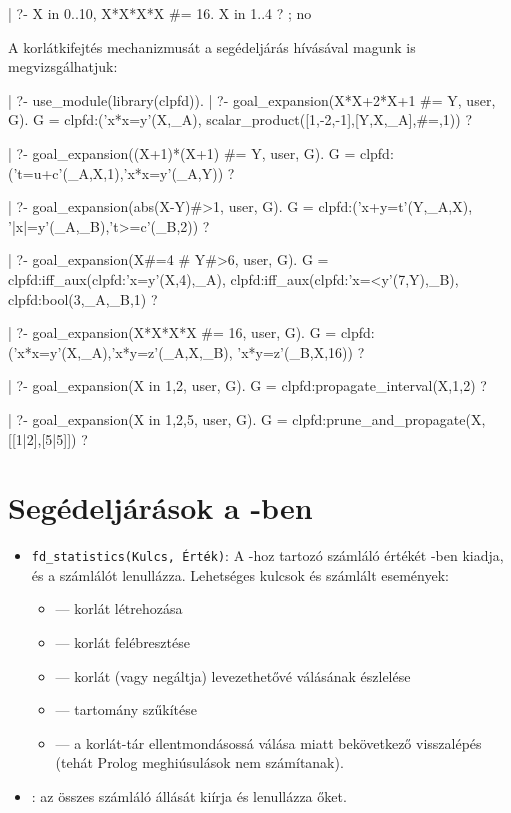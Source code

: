 \begin{prologcode}
| ?- X in 0..10, X*X*X*X #= 16.
X in 1..4 ? ;
no
\end{prologcode}

A korlátkifejtés mechanizmusát a  segédeljárás
hívásával magunk is megvizsgálhatjuk:

\begin{prologcode}
| ?- use_module(library(clpfd)).
| ?- goal_expansion(X*X+2*X+1 #= Y, user, G).
        G = clpfd:('x*x=y'(X,_A),
            scalar_product([1,-2,-1],[Y,X,_A],#=,1)) ?

| ?- goal_expansion((X+1)*(X+1) #= Y, user, G).
        G = clpfd:('t=u+c'(_A,X,1),'x*x=y'(_A,Y)) ?

| ?- goal_expansion(abs(X-Y)#>1, user, G).
        G = clpfd:('x+y=t'(Y,_A,X),
               '|x|=y'(_A,_B),'t>=c'(_B,2)) ?

| ?- goal_expansion(X#=4 #\/ Y#>6, user, G).
        G = clpfd:iff_aux(clpfd:'x=y'(X,4),_A),
               clpfd:iff_aux(clpfd:'x=<y'(7,Y),_B),
               clpfd:bool(3,_A,_B,1) ?  %

| ?- goal_expansion(X*X*X*X #= 16, user, G).
        G = clpfd:('x*x=y'(X,_A),'x*y=z'(_A,X,_B),
                      'x*y=z'(_B,X,16)) ?

| ?- goal_expansion(X in {1,2}, user, G).
        G = clpfd:propagate_interval(X,1,2) ?

| ?- goal_expansion(X in {1,2,5}, user, G).
        G = clpfd:prune_and_propagate(X,[[1|2],[5|5]]) ?
\end{prologcode}

\section{Segédeljárások a \Clpfd -ben}

\begin{itemize}
\item {\tt fd\_statistics(Kulcs, Érték)}: A -hoz tartozó
        számláló értékét -ben kiadja, és a számlálót lenullázza.
        Lehetséges kulcsok és számlált események:
\begin{itemize}
\item {} --- korlát létrehozása
\item {} --- korlát felébresztése
\item {} --- korlát (vagy negáltja) levezethetővé válásának
        észlelése
\item {}    --- tartomány szűkítése
\item {}  --- a korlát-tár ellentmondásossá válása miatt
        bekövetkező visszalépés (tehát Prolog meghiúsulások nem számítanak).
\end{itemize}
\item {}: az összes számláló állását kiírja és
        lenullázza őket.
\end{itemize}

